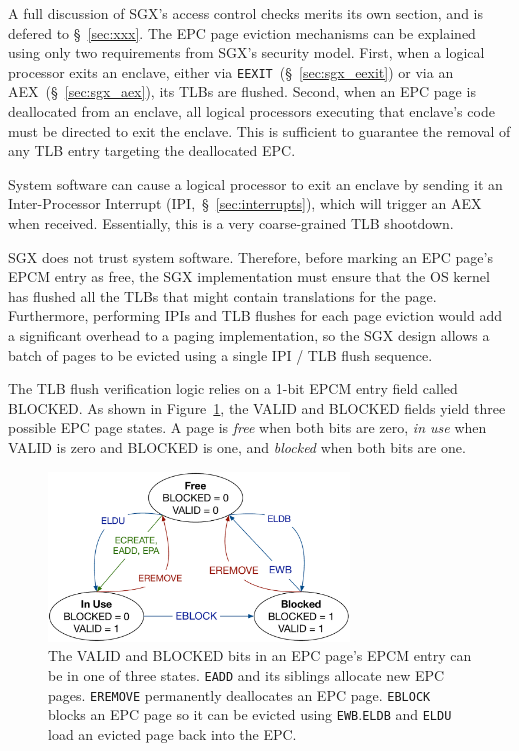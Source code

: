 A full discussion of SGX's access control checks merits its own section, and is
defered to \S~\ref{sec:xxx}. The EPC page eviction mechanisms can be explained
using only two requirements from SGX's security model. First, when a logical
processor exits an enclave, either via
\texttt{EEXIT}~(\S~\ref{sec:sgx_eexit}) or via an AEX~(\S~\ref{sec:sgx_aex}),
its TLBs are flushed. Second, when an EPC page is deallocated from an enclave,
all logical processors executing that enclave's code must be directed to exit
the enclave. This is sufficient to guarantee the removal of any TLB entry
targeting the deallocated EPC.

System software can cause a logical processor to exit an enclave by sending it
an Inter-Processor Interrupt (IPI,~\S~\ref{sec:interrupts}), which will trigger
an AEX when received. Essentially, this is a very coarse-grained TLB shootdown.

SGX does not trust system software. Therefore, before marking an EPC page's
EPCM entry as free, the SGX implementation must ensure that the OS kernel has
flushed all the TLBs that might contain translations for the page. Furthermore,
performing IPIs and TLB flushes for each page eviction would add a significant
overhead to a paging implementation, so the SGX design allows a batch of pages
to be evicted using a single IPI / TLB flush sequence.


The TLB flush verification logic relies on a 1-bit EPCM entry field called
BLOCKED. As shown in Figure~\ref{fig:sgx_page_states}, the VALID and BLOCKED
fields yield three possible EPC page states. A page is \textit{free} when both
bits are zero, \textit{in use} when VALID is zero and BLOCKED is one, and
\textit{blocked} when both bits are one.

\begin{figure}[hbt]
  \centering
  \includegraphics[width=80mm]{figures/sgx_page_states.pdf}
  \caption{
    The VALID and BLOCKED bits in an EPC page's EPCM entry can be in one of
    three states. \texttt{EADD} and its siblings allocate new EPC pages.
    \texttt{EREMOVE} permanently deallocates an EPC page. \texttt{EBLOCK}
    blocks an EPC page so it can be evicted using \texttt{EWB}.\texttt{ELDB}
    and \texttt{ELDU} load an evicted page back into the EPC.
  }
  \label{fig:sgx_page_states}
\end{figure}

